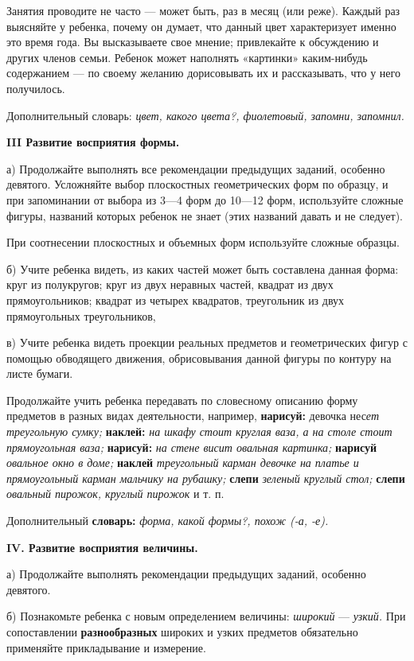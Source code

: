 \documentclass[a5paper]{book}
\renewcommand{\emph}[1]{\textit{#1}}
\begin{document}
Занятия проводите не часто --- может быть, раз в месяц (или реже).
Каждый раз выясняйте у ребенка, почему он думает, что данный цвет
характеризует именно это время года. Вы высказываете свое мнение;
привлекайте к обсуждению и других членов семьи. Ребенок может наполнять
«картинки» каким-нибудь содержанием --- по своему желанию дорисовывать
их и рассказывать, что у него получилось.

Дополнительный словарь: \emph{цвет, какого цвета?, фиолетовый, запомни,
запомнил.}

\textbf{III Развитие восприятия формы.}

а) Продолжайте выполнять все рекомендации предыдущих заданий, особенно
девятого. Усложняйте выбор плоскостных геометрических форм по образцу, и
при запоминании от выбора из 3---4 форм до 10---12 форм, используйте
сложные фигуры, названий которых ребенок не знает (этих названий давать
и не следует).

При соотнесении плоскостных и объемных форм используйте сложные образцы.

б) Учите ребенка видеть, из каких частей может быть составлена данная
форма: круг из полукругов; круг из двух неравных частей, квадрат из двух
прямоугольников; квадрат из четырех квадратов, треугольник из двух
прямоугольных треугольников,

в) Учите ребенка видеть проекции реальных предметов и геометрических
фигур с помощью обводящего движения, обрисовывания данной фигуры по
контуру на листе бумаги.

Продолжайте учить ребенка передавать по словесному описанию форму
предметов в разных видах деятельности, например, \textbf{нарисуй:}
девочка нес\emph{ет треугольную сумку;} \textbf{наклей:} \emph{на шкафу
стоит круглая ваза, а на столе стоит прямоугольная ваза;}
\textbf{нарисуй:} \emph{на стене висит овальная картинка;}
\textbf{нарисуй} \emph{овальное окно в доме;} \textbf{наклей}
\emph{треугольный карман девочке на платье и прямоугольный карман
мальчику на рубашку;} \textbf{слепи} \emph{зеленый круглый стол;}
\textbf{слепи} \emph{овальный пирожок, круглый пирожок} и т. п.

Дополнительный \textbf{словарь:} \emph{форма, какой формы?, похож (-а,
-е).}

\textbf{IV. Развитие восприятия величины.}

а) Продолжайте выполнять рекомендации предыдущих заданий, особенно
девятого.

б) Познакомьте ребенка с новым определением величины: \emph{широкий} ---
\emph{узкий.} При сопоставлении \textbf{разнообразных} широких и узких
предметов обязательно применяйте прикладывание и измерение.
\end{document}
